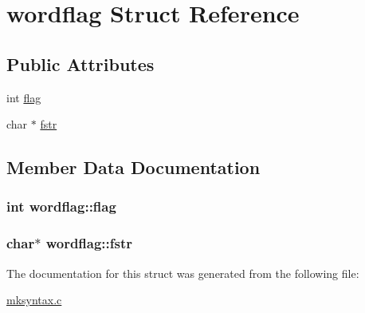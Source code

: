 \hypertarget{structwordflag}{}\section{wordflag Struct Reference}
\label{structwordflag}
\subsection*{Public Attributes}
\begin{DoxyCompactItemize}
\item 
int \hyperlink{structwordflag_a7227a5f65db202538c0fd5bb88239c6b}{flag}
\item 
char $\ast$ \hyperlink{structwordflag_a1e15a044d32026bfe98625031b046860}{fstr}
\end{DoxyCompactItemize}


\subsection{Member Data Documentation}
\subsubsection[{\texorpdfstring{flag}{flag}}]{\setlength{\rightskip}{0pt plus 5cm}int wordflag\+::flag}\hypertarget{structwordflag_a7227a5f65db202538c0fd5bb88239c6b}{}\label{structwordflag_a7227a5f65db202538c0fd5bb88239c6b}
\subsubsection[{\texorpdfstring{fstr}{fstr}}]{\setlength{\rightskip}{0pt plus 5cm}char$\ast$ wordflag\+::fstr}\hypertarget{structwordflag_a1e15a044d32026bfe98625031b046860}{}\label{structwordflag_a1e15a044d32026bfe98625031b046860}


The documentation for this struct was generated from the following file\+:\begin{DoxyCompactItemize}
\item 
\hyperlink{mksyntax_8c}{mksyntax.\+c}\end{DoxyCompactItemize}
